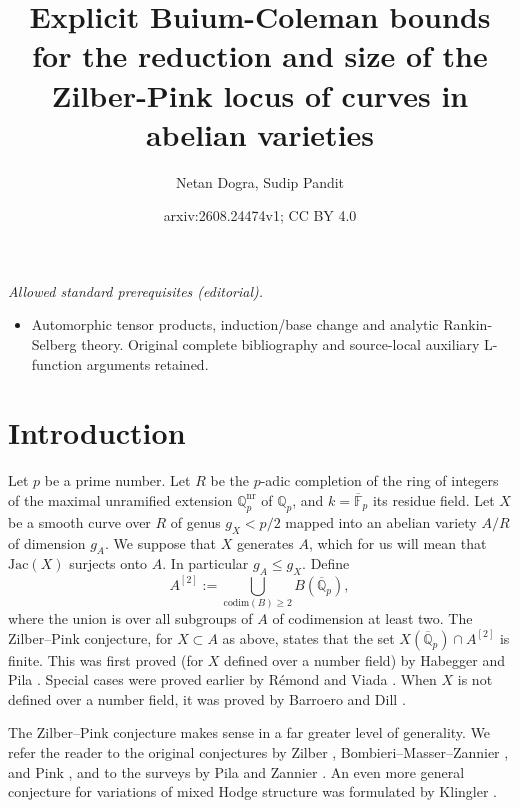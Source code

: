 \documentclass[11pt]{amsart}
\title{Explicit Buium-Coleman bounds for the reduction and size of the Zilber-Pink locus of curves in abelian varieties}
\author{Netan Dogra, Sudip Pandit}
\date{arxiv:2608.24474v1; CC BY 4.0}
\def\Q{\mathbb Q}
\theoremstyle{plain}
\theoremstyle{definition}
\newcommand{\F}{\mathbb{F}}
\newcommand{\Jac}{\mathrm{Jac}}
\begin{document}
\maketitle
\noindent\textit{Allowed standard prerequisites (editorial).}\begin{itemize}
\item Automorphic tensor products, induction/base change and analytic Rankin-Selberg theory. Original complete bibliography and source-local auxiliary L-function arguments retained.
\end{itemize}\medskip
\section{Introduction}
Let $p$ be a prime number. Let $R$ be the $p$-adic completion of the ring of integers of the maximal unramified extension $\Q _p ^{\mathrm{nr}}$ of $\Q _p $, and $k=\overline{\F }_p $ its residue field. Let $X$ be a smooth curve over $R$ of genus $g_X <p/2$ mapped into an abelian variety $A/R$ of dimension $g_A$. We suppose that $X$ generates $A$, which for us will mean that $\Jac (X)$ surjects onto $A$. In particular $g_A \leq g_X$.
Define 
\[
A^{[2]}:=\bigcup_{\mathrm{codim} (B)\geq 2} B(\overline{\Q }_p ),
\]
where the union is over all subgroups of $A$ of codimension at least two.  The Zilber--Pink conjecture, for $X\subset A$ as above, states that the set $X(\overline{\mathbb{\Q }}_p )\cap A^{[2]}$ is finite. This was first proved (for $X$ defined over a number field) by Habegger and Pila \cite{HP}. Special cases were proved earlier by R\'emond \cite{rem3} and Viada \cite{viada1} \cite{viada2}. When $X$ is not defined over a number field, it was proved by Barroero and Dill \cite{BD}. 

The Zilber--Pink conjecture makes sense in a far greater level of generality. We refer the reader to the original conjectures by Zilber \cite{zilber}, Bombieri--Masser--Zannier \cite{BMZ}, and Pink \cite{pink}, and to the surveys by Pila \cite{pila} and Zannier \cite{zannier}. An even more general conjecture for variations of mixed Hodge structure was formulated by Klingler \cite{klingler}.
\end{document}

